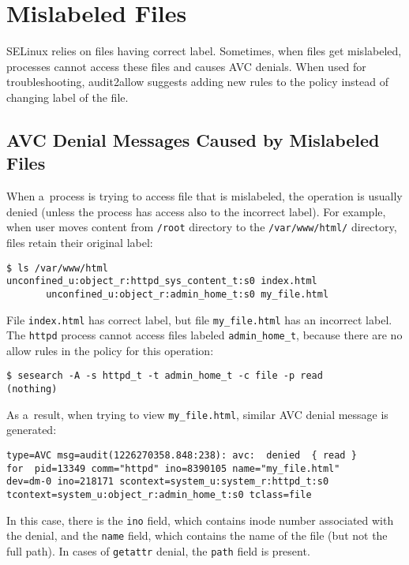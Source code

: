 \section{Mislabeled Files}
\label{mislabeled}
SELinux relies on files having correct label. Sometimes, when files get
mislabeled, processes cannot access these files and causes AVC denials. When
used for troubleshooting, audit2allow suggests adding new rules to the policy
instead of changing label of the file.

\subsection{AVC Denial Messages Caused by Mislabeled Files}
When a~process is trying to access file that is mislabeled, the operation is
usually denied (unless the process has access also to the incorrect label). For
example, when user moves content from \texttt{/root} directory to the
\texttt{/var/www/html/} directory, files retain their original label:
\begin{lstlisting}
$ ls /var/www/html
unconfined_u:object_r:httpd_sys_content_t:s0 index.html
       unconfined_u:object_r:admin_home_t:s0 my_file.html
\end{lstlisting}
File \texttt{index.html} has correct label, but file \texttt{my\_file.html} has
an incorrect label. The \texttt{httpd} process cannot access files labeled
\texttt{admin\_home\_t}, because there are no allow rules in the policy for this
operation:
\begin{lstlisting}
$ sesearch -A -s httpd_t -t admin_home_t -c file -p read
(nothing)
\end{lstlisting}

As a~result, when trying to view \texttt{my\_file.html}, similar AVC denial
message is generated:
\begin{lstlisting}
type=AVC msg=audit(1226270358.848:238): avc:  denied  { read }
for  pid=13349 comm="httpd" ino=8390105 name="my_file.html"
dev=dm-0 ino=218171 scontext=system_u:system_r:httpd_t:s0
tcontext=system_u:object_r:admin_home_t:s0 tclass=file
\end{lstlisting}
In this case, there is the \texttt{ino} field, which contains inode number
associated with the denial, and the \texttt{name} field, which contains the name
of the file (but not the full path). In cases of \texttt{getattr} denial, the
\texttt{path} field is present.

